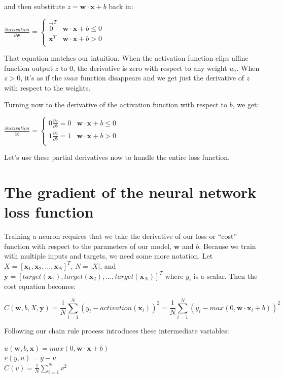 \documentclass[11pt]{article}
\begin{document}
and then substitute $z = \mathbf{w} \cdot \mathbf{x} + b$ back in:
 
$\frac{\partial activation}{\partial \mathbf{w}} = \begin{cases}
	\vec{0}^T & \mathbf{w} \cdot \mathbf{x} + b \leq 0\\
	\mathbf{x}^T & \mathbf{w} \cdot \mathbf{x} + b > 0\\
\end{cases}$

That equation matches our intuition.  When the activation function clips affine function output $z$ to 0, the derivative is zero with respect to any weight $w_i$. When $z > 0$, it's as if the $max$ function disappears and we get just the derivative of $z$ with respect to the weights. 

Turning now to the derivative of the activation function with respect to $b$, we get:
 
$\frac{\partial activation}{\partial b} = \begin{cases}
	0\frac{\partial z}{\partial b} = 0 & \mathbf{w} \cdot \mathbf{x} + b \leq 0\\
	1\frac{\partial z}{\partial b} = 1 & \mathbf{w} \cdot \mathbf{x} + b > 0\\
\end{cases}
$

Let's use these partial derivatives now to handle the entire loss function.

\section{The gradient of the neural network loss function}

Training a neuron requires that we take the derivative of our loss  or ``cost'' function with respect to the parameters of our model, $\mathbf{w}$ and $b$. Because we train with multiple inputs and targets, we need some more notation. Let $X = [\mathbf{x}_1, \mathbf{x}_2, \ldots, \mathbf{x}_N]^T$, $N=|X|$, and $\mathbf{y} = [target(\mathbf{x}_1), target(\mathbf{x}_2), \ldots, target(\mathbf{x}_N)]^T$ where $y_i$ is a scalar. Then the cost equation becomes:

\[
C(\mathbf{w},b,X,\mathbf{y}) = \frac{1}{N} \sum_{i=1}^{N} (y_i - activation(\mathbf{x}_i))^2 = \frac{1}{N} \sum_{i=1}^{N} (y_i - max(0, \mathbf{w}\cdot\mathbf{x}_i+b))^2
\]

Following our chain rule process introduces these intermediate variables:
 
$u(\mathbf{w},b,\mathbf{x}) = max(0, \mathbf{w}\cdot\mathbf{x}+b)$\\
$v(y,u) = y - u$\\
$C(v) = \frac{1}{N} \sum_{i=1}^N v^2$
\end{document}
